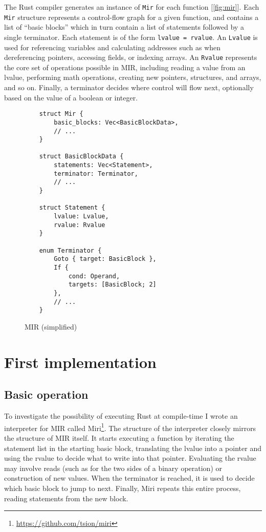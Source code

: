 \documentclass[twocolumn]{article}
\newcommand{\rust}[1]{\texttt{#1}}
\begin{document}
The Rust compiler generates an instance of \rust{Mir} for each function [\autoref{fig:mir}]. Each
\rust{Mir} structure represents a control-flow graph for a given function, and contains a list of
``basic blocks'' which in turn contain a list of statements followed by a single terminator. Each
statement is of the form \rust{lvalue = rvalue}. An \rust{Lvalue} is used for referencing variables
and calculating addresses such as when dereferencing pointers, accessing fields, or indexing arrays.
An \rust{Rvalue} represents the core set of operations possible in MIR, including reading a value
from an lvalue, performing math operations, creating new pointers, structures, and arrays, and so
on. Finally, a terminator decides where control will flow next, optionally based on the value of a
boolean or integer.

\begin{figure}[ht]
  \begin{verbatim}
    struct Mir {
        basic_blocks: Vec<BasicBlockData>,
        // ...
    }

    struct BasicBlockData {
        statements: Vec<Statement>,
        terminator: Terminator,
        // ...
    }

    struct Statement {
        lvalue: Lvalue,
        rvalue: Rvalue
    }

    enum Terminator {
        Goto { target: BasicBlock },
        If {
            cond: Operand,
            targets: [BasicBlock; 2]
        },
        // ...
    }
  \end{verbatim}
  \caption{MIR (simplified)}
  \label{fig:mir}
\end{figure}


\section{First implementation}

\subsection{Basic operation}

To investigate the possibility of executing Rust at compile-time I wrote an interpreter for MIR
called Miri\footnote{\url{https://github.com/tsion/miri}}. The structure of the interpreter closely
mirrors the structure of MIR itself. It starts executing a function by iterating the statement list
in the starting basic block, translating the lvalue into a pointer and using the rvalue to decide
what to write into that pointer. Evaluating the rvalue may involve reads (such as for the two sides
of a binary operation) or construction of new values. When the terminator is reached, it is used to
decide which basic block to jump to next. Finally, Miri repeats this entire process, reading
statements from the new block.
\end{document}
